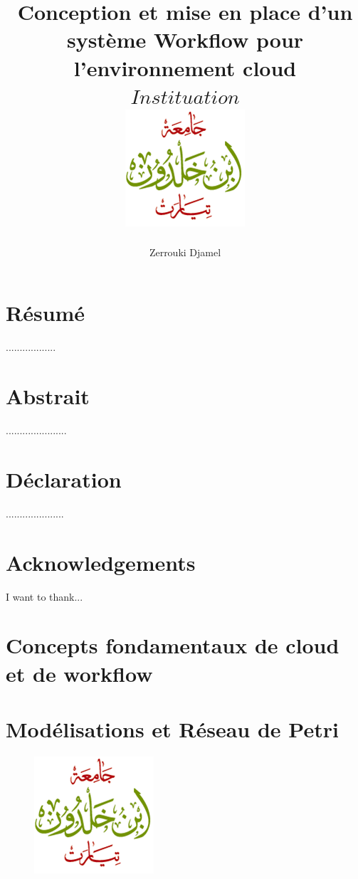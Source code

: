 \documentclass[12pt,twoside]{report}
\title{
	{\textbf{Conception et mise en place d’un système Workflow  pour l'environnement cloud}} \\   
	{$ Instituation $}\\
	{\includegraphics{univtiaret.png}}
}
\author{Zerrouki Djamel}
\begin{document}
 
\chapter*{Résumé}
..................

\chapter*{Abstrait}
......................

\chapter*{Déclaration}
.....................

\chapter*{Acknowledgements}
I want to thank...
\listoffigures

\listoftables

\tableofcontents


\chapter{Concepts fondamentaux de cloud et de workflow }



\chapter{Modélisations et Réseau de Petri}


%
 \begin{figure}
 	\centering
 	\includegraphics[width=0.7\linewidth]{images/univtiaret}
 	\caption{}
 	\label{fig:univtiaret}
 \end{figure}
 

 \printbibliography
\end{document}
